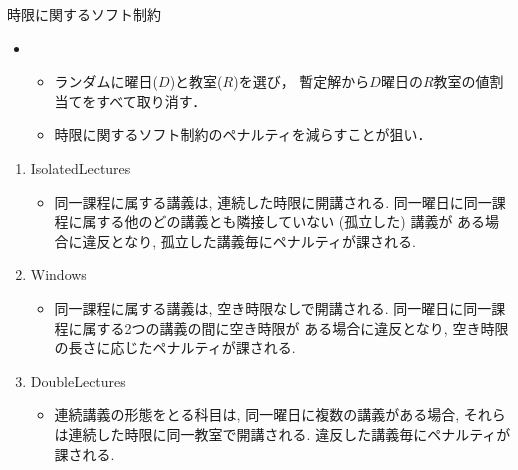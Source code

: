 \documentclass[11pt,dvipdfmx,handout]{beamer}
\begin{document}
\begin{frame}{時限に関するソフト制約}
 \begin{block}{}
 \begin{itemize}
  \item {}
   \begin{itemize}
    \item ランダムに曜日($D$)と教室($R$)を選び，
    暫定解から$D$曜日の$R$教室の値割当てをすべて取り消す．
    \item 時限に関するソフト制約のペナルティを減らすことが狙い．
   \end{itemize}
  \end{itemize}
 \end{block}
 \begin{enumerate}
  \item \alert{IsolatedLectures}
   \begin{itemize}
    \item  同一課程に属する講義は, 連続した時限に開講される. 
    同一曜日に同一課程に属する他のどの講義とも隣接していない (孤立した) 講義が
    ある場合に違反となり, 孤立した講義毎にペナルティが課される.
    \end{itemize}
  \item \alert{Windows}
   \begin{itemize}
    \item 同一課程に属する講義は, 空き時限なしで開講される. 
    同一曜日に同一課程に属する2つの講義の間に空き時限が
    ある場合に違反となり, 空き時限の長さに応じたペナルティが課される.   
    \end{itemize}
  \item DoubleLectures
   \begin{itemize}
    \item 連続講義の形態をとる科目は, 同一曜日に複数の講義がある場合, 
    それらは連続した時限に同一教室で開講される. 
    違反した講義毎にペナルティが課される.   
    \end{itemize}
 \end{enumerate}
\end{frame}
\end{document}
